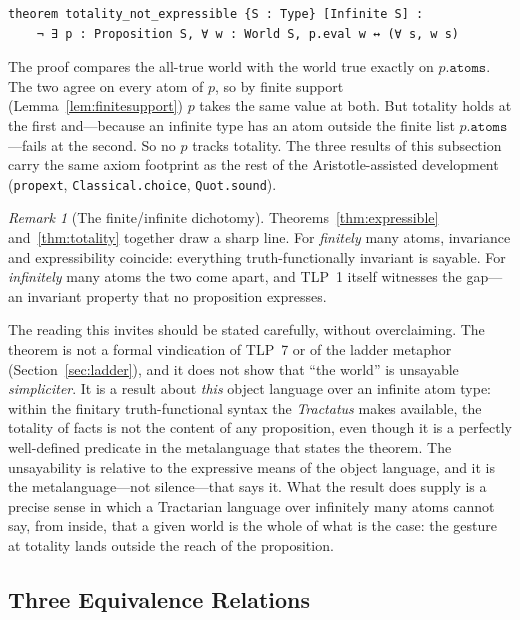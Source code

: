 \documentclass[jsl,bibother]{asl}
\theoremstyle{definition}
\theoremstyle{remark}
\newtheorem{remark}[theorem]{Remark}
\begin{document}
\begin{lstlisting}
theorem totality_not_expressible {S : Type} [Infinite S] :
    ¬ ∃ p : Proposition S, ∀ w : World S, p.eval w ↔ (∀ s, w s)
\end{lstlisting}

\noindent
The proof compares the all-true world with the world true exactly
on $p.\mathtt{atoms}$.  The two agree on every atom of $p$, so by
finite support (Lemma~\ref{lem:finitesupport}) $p$ takes the same
value at both.  But totality holds at the first and---because an
infinite type has an atom outside the finite list
$p.\mathtt{atoms}$---fails at the second.  So no $p$ tracks
totality.  The three results of this subsection carry the same axiom footprint as
the rest of the Aristotle-assisted development
(\texttt{propext}, \texttt{Classical.choice},
\texttt{Quot.sound}).

\begin{remark}[The finite/infinite dichotomy]
\label{rem:dichotomy}
Theorems~\ref{thm:expressible} and~\ref{thm:totality} together
draw a sharp line.  For \emph{finitely} many atoms, invariance
and expressibility coincide: everything truth-functionally
invariant is sayable.  For \emph{infinitely} many atoms the two
come apart, and TLP~1 itself witnesses the gap---an invariant
property that no proposition expresses.

The reading this invites should be stated carefully, without
overclaiming.  The theorem is not a formal vindication of TLP~7 or
of the ladder metaphor (Section~\ref{sec:ladder}), and it does not
show that ``the world'' is unsayable \emph{simpliciter}.  It is a
result about \emph{this} object language over an infinite atom
type: within the finitary truth-functional syntax the
\emph{Tractatus} makes available, the totality of facts is not the
content of any proposition, even though it is a perfectly
well-defined predicate in the metalanguage that states the
theorem.  The unsayability is relative to the expressive means of
the object language, and it is the metalanguage---not silence---that
says it.  What the result does supply is a precise sense in which a
Tractarian language over infinitely many atoms cannot say, from
inside, that a given world is the whole of what is the case: the
gesture at totality lands outside the reach of the proposition.
\end{remark}

\subsection{Three Equivalence Relations}
\label{sec:hierarchy}
\end{document}
